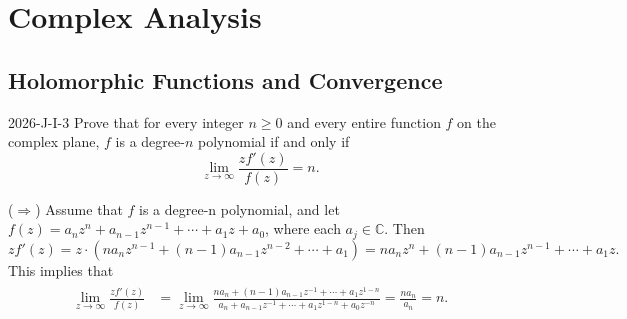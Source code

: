 \documentclass{article}
\begin{document}
	\newpage 

	\section{Complex Analysis}
	
	\subsection{Holomorphic Functions and Convergence}
	
	\begin{prb}{2026-J-I-3}
		Prove that for every integer $n \geq 0$ and every entire function $f$ on the complex plane, $f$ is a degree-$n$ polynomial if and only if 
		\begin{equation*}
			\lim_{z \to \infty}\frac{zf'(z)}{f(z)} = n. 
		\end{equation*}
	\end{prb}
	($\Longrightarrow$) Assume that $f$ is a degree-n polynomial, and let $f(z) = a_{n}z^{n} + a_{n-1}z^{n-1} + \dotsm + a_{1}z + a_{0}$, where each $a_{j} \in \mathbb{C}$. Then 
	\begin{equation*}
		zf'(z) = z\cdot \left(na_{n}z^{n-1} + (n-1)a_{n-1}z^{n-2} + \dotsm + a_{1}\right) = na_{n}z^{n} + (n-1)a_{n-1}z^{n-1} + \dotsm + a_{1}z. 
	\end{equation*}
	This implies that 
	\begin{align*}
		\begin{split}
			\lim_{z \to \infty}\frac{zf'(z)}{f(z)} &= \lim_{z \to \infty}\frac{na_{n} + (n-1)a_{n-1}z^{-1} + \dotsm + a_{1}z^{1 - n}}{a_{n} + a_{n-1}z^{-1} + \dotsm + a_{1}z^{1-n} + a_{0}z^{-n}} = \frac{na_{n}}{a_{n}} = n. 
		\end{split}
	\end{align*}
	
\end{document}
